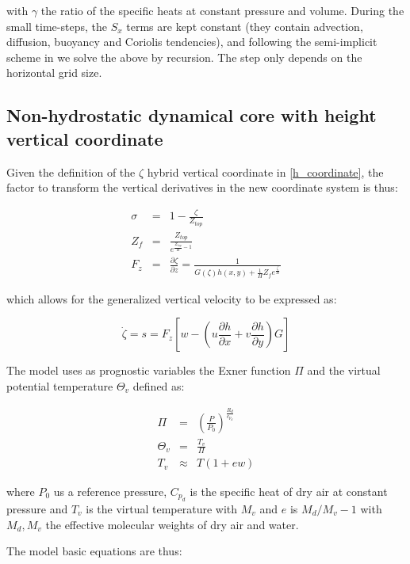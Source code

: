 with $\gamma$ the ratio of the specific heats at constant pressure and volume.
During the small time-steps, the $S_x$ terms are kept constant (they contain
advection, diffusion, buoyancy and Coriolis tendencies), and following the
semi-implicit scheme in \cite{Klemp_1978} we solve the above by recursion.
The step only depends on the horizontal grid size.

\subsection{Non-hydrostatic dynamical core with height vertical coordinate}

Given the definition of the $\zeta$ hybrid vertical coordinate in
\ref{h_coordinate}, the factor to transform the vertical derivatives in
the new coordinate system is thus:

\begin{eqnarray}
\sigma &=& 1 - \frac{\zeta}{Z_{top}} \\
Z_f &=& \frac{Z_{top}}{e^{\frac{Z_{top}}{H}-1}} \\
F_z &=& \frac{\partial \zeta}{\partial z} =
     \frac{1}{G(\zeta) h(x,y) + \frac{1}{H}
     Z_f e^{\frac{\zeta}{H}}}
\end{eqnarray}

which allows for the generalized vertical velocity to be expressed as:

\begin{equation}
\dot{\zeta} = s = F_z \left[ w - 
              \left( u \frac{\partial h}{\partial x} +
                     v \frac{\partial h}{\partial y} \right) G \right]
\end{equation}

The model uses as prognostic variables the Exner function
$\Pi$ and the virtual potential temperature $\Theta_v$ defined as:

\begin{eqnarray}
  \Pi &=& \left(\frac{P}{P_0}\right)^{\frac{R_d}{c_{p_d}}} \\
  \Theta_v &=& \frac{T_v}{\Pi} \\
  T_v &\approx& T \left( 1 + e w \right)
\end{eqnarray}

where $P_0$ us a reference pressure, $C_{p_d}$ is the specific heat of dry
air at constant pressure and $T_v$ is the virtual temperature with $M_v$ and
$e$ is $M_d/M_v - 1$ with $M_d,M_v$ the effective molecular weights of dry air
and water.

The model basic equations are thus:

